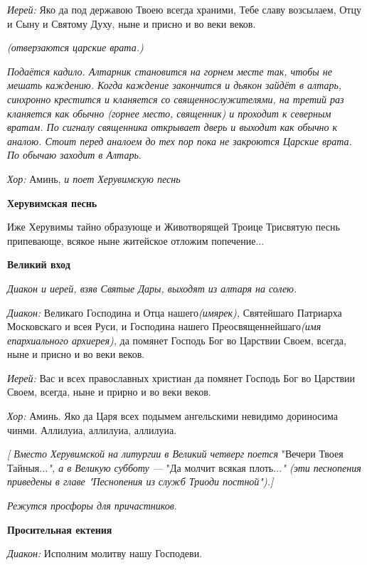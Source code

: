 {\itshape    Иерей:} Яко да под державою Твоею всегда храними, Тебе славу возсылаем, Отцу и Сыну и Святому Духу, ныне и присно и во веки веков.  

 {\itshape (отверзаются царские врата.)} 

 {\itshape Подаётся кадило. Алтарник становится на горнем месте так, чтобы не мешать каждению. Когда каждение закончится и дьякон зайдёт в алтарь, синхронно крестится и кланяется со священнослужителями, на третий раз кланяется как обычно (горнее место, священник) и проходит к северным вратам. По сигналу священника открывает дверь и выходит как обычно к аналою. Стоит перед аналоем до тех пор пока не закроются Царские врата. По обычаю заходит в Алтарь}. 

 {\itshape  Хор:} Аминь, {\itshape и поет Херувимскую песнь } 

\medskip 

 {\bfseries Херувимская песнь }

   Иже Херувимы тайно образующе и Животворящей Троице Трисвятую песнь припевающе, всякое ныне житейское отложим попечение...  

\medskip 

{\bfseries  Великий вход }

 {\itshape  Диакон и иерей, взяв Святые Дары, выходят из алтаря на солею.}

 {\itshape  Диакон:} Великаго Господина и Отца нашего{\itshape  (имярек),} Святейшаго Патриарха Московскаго и всея Руси, и Господина нашего Преосвященнейшаго{\itshape  (имя епархиального архиерея),} да помянет Господь Бог во Царствии Своем, всегда, ныне и присно и во веки веков.

 {\itshape  Иерей:} Вас и всех православных христиан да помянет Господь Бог во Царствии Своем, всегда, ныне и прирно и во веки веков.

 {\itshape Хор:} Аминь. Яко да Царя всех подымем ангельскими невидимо дориносима чинми. Аллилуиа, аллилуиа, аллилуиа. 

 {\itshape  [ Вместо Херувимской на литургии в Великий четверг поется }"Вечери Твоея Тайныя..{\itshape .", а в Великую субботу — }"Да молчит всякая плоть..{\itshape ." (эти песнопения приведены в главе "Песнопения из служб Триоди постной").]} 

 {\itshape  Режутся просфоры для причастников}.  

\medskip 

 {\bfseries Просительная ектения }

 {\itshape  Диакон:} Исполним молитву нашу Господеви. 

